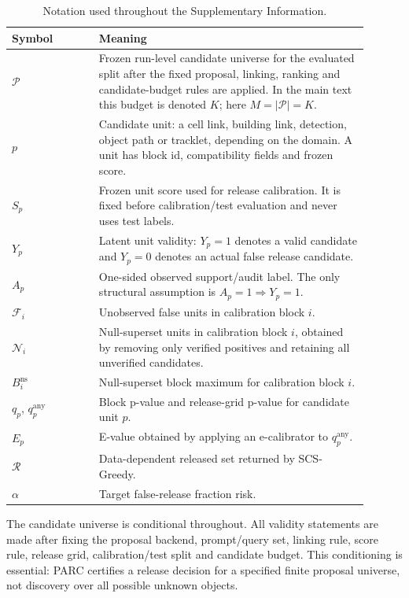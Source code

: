 \documentclass[11pt]{article}
\newcommand{\Pcal}{\mathcal P}
\newcommand{\Ncal}{\mathcal N}
\newcommand{\Fcal}{\mathcal F}
\newcommand{\Rcal}{\mathcal R}
\begin{document}
\begin{table}[h]
\centering
\caption{Notation used throughout the Supplementary Information.}
\small
\begin{tabular}{p{0.22\linewidth}p{0.68\linewidth}}
\toprule
Symbol & Meaning \\
\midrule
\(\Pcal\) & Frozen run-level candidate universe for the evaluated split after the fixed proposal, linking, ranking and candidate-budget rules are applied. In the main text this budget is denoted \(K\); here \(M=|\Pcal|=K\). \\
\(p\) & Candidate unit: a cell link, building link, detection, object path or tracklet, depending on the domain. A unit has block id, compatibility fields and frozen score. \\
\(S_p\) & Frozen unit score used for release calibration. It is fixed before calibration/test evaluation and never uses test labels. \\
\(Y_p\) & Latent unit validity: \(Y_p=1\) denotes a valid candidate and \(Y_p=0\) denotes an actual false release candidate. \\
\(A_p\) & One-sided observed support/audit label. The only structural assumption is \(A_p=1\Rightarrow Y_p=1\). \\
\(\Fcal_i\) & Unobserved false units in calibration block \(i\). \\
\(\Ncal_i\) & Null-superset units in calibration block \(i\), obtained by removing only verified positives and retaining all unverified candidates. \\
\(B_i^{\mathrm{ns}}\) & Null-superset block maximum for calibration block \(i\). \\
\(q_p\), \(q_p^{\mathrm{any}}\) & Block p-value and release-grid p-value for candidate unit \(p\). \\
\(E_p\) & E-value obtained by applying an e-calibrator to \(q_p^{\mathrm{any}}\). \\
\(\Rcal\) & Data-dependent released set returned by SCS-Greedy. \\
\(\alpha\) & Target false-release fraction risk. \\
\bottomrule
\end{tabular}
\end{table}

The candidate universe is conditional throughout.
All validity statements are made after fixing the proposal backend, prompt/query set, linking rule, score rule, release grid, calibration/test split and candidate budget.
This conditioning is essential: PARC certifies a release decision for a specified finite proposal universe, not discovery over all possible unknown objects.
\end{document}
